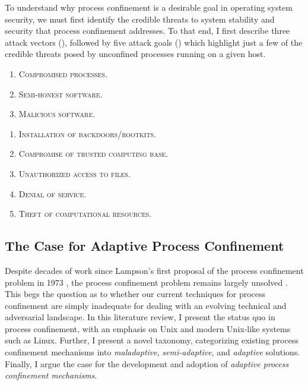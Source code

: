 \documentclass[dvipsnames, 12pt]{article}
\begin{document}
To understand why process confinement is a desirable goal in operating system
security, we must first identify the credible threats to system stability and
security that process confinement addresses. To that end, I first describe three
attack vectors (), followed by five attack goals
() which highlight just a few of the credible threats posed
by unconfined processes running on a given host.

\begin{enumerate}[label=\bfseries A\arabic*., ref=A\arabic*, labelindent=2em]
    \item \label{a:1} \textsc{Compromised processes.} 

    \item \label{a:2} \textsc{Semi-honest software.} 

    \item \label{a:3} \textsc{Malicious software.} 
\end{enumerate}

\begin{enumerate}[label=\bfseries G\arabic*., ref=G\arabic*, labelindent=2em]
    \item \label{g:1} \textsc{Installation of backdoors/rootkits.} 

    \item \label{g:2} \textsc{Compromise of trusted computing base.} 

    \item \label{g:3} \textsc{Unauthorized access to files.} 

    \item \label{g:4} \textsc{Denial of service.} 

    \item \label{g:5} \textsc{Theft of computational resources.} 
\end{enumerate}


\subsection{The Case for Adaptive Process Confinement}

Despite decades of work since Lampson's first proposal of the process
confinement problem in 1973 \cite{lampson1973_a_note}, the process confinement
problem remains largely unsolved \cite{crowell2013_confinement_problem}. This
begs the question as to whether our current techniques for process confinement
are simply inadequate for dealing with an evolving technical and adversarial
landscape. In this literature review, I present the status quo in process
confinement, with an emphasis on Unix and modern Unix-like systems such as
Linux.  Further, I present a novel taxonomy, categorizing existing process
confinement mechanisms into \textit{maladaptive}, \textit{semi-adaptive}, and
\textit{adaptive} solutions. Finally, I argue the case for the development and
adoption of \textit{adaptive process confinement mechanisms}.
\end{document}
